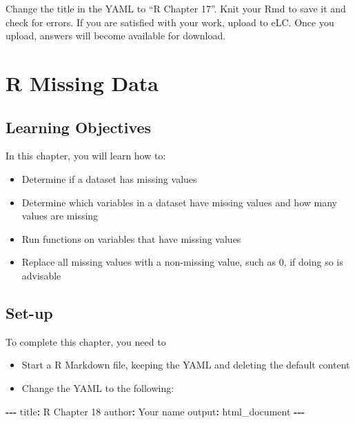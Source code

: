 \documentclass[
]{book}
\makeatletter
\newenvironment{Shaded}{\begin{snugshade}}{\end{snugshade}}
\newcommand{\NormalTok}[1]{#1}
\newcommand{\SpecialCharTok}[1]{\textcolor[rgb]{0.43,0.43,0.43}{\textbf{#1}}}
\newcommand{\StringTok}[1]{\textcolor[rgb]{0.5,0.5,0.5}{#1}}
\providecommand{\tightlist}{%
  \setlength{\itemsep}{0pt}\setlength{\parskip}{0pt}}
\newenvironment{kframe}{%
\medskip{}
\setlength{\fboxsep}{.8em}
 \def\at@end@of@kframe{}%
 \ifinner\ifhmode%
  \def\at@end@of@kframe{\end{minipage}}%
  \begin{minipage}{\columnwidth}%
 \fi\fi%
 \def\FrameCommand##1{\hskip\@totalleftmargin \hskip-\fboxsep
 \colorbox{shadecolor}{##1}\hskip-\fboxsep
     \hskip-\linewidth \hskip-\@totalleftmargin \hskip\columnwidth}%
 \MakeFramed {\advance\hsize-\width
   \@totalleftmargin\z@ \linewidth\hsize
   \@setminipage}}%
 {\par\unskip\endMakeFramed%
 \at@end@of@kframe}
\renewenvironment{Shaded}{\begin{kframe}}{\end{kframe}}
\makeatother
\begin{document}
Change the title in the YAML to ``R Chapter 17''. Knit your Rmd to save it and check for errors. If you are satisfied with your work, upload to eLC. Once you upload, answers will become available for download.

\hypertarget{r-missing-data}{%
\chapter{R Missing Data}\label{r-missing-data}}

\hypertarget{learning-objectives-1}{%
\section{Learning Objectives}\label{learning-objectives-1}}

In this chapter, you will learn how to:

\begin{itemize}
\tightlist
\item
  Determine if a dataset has missing values
\item
  Determine which variables in a dataset have missing values and how many values are missing
\item
  Run functions on variables that have missing values
\item
  Replace all missing values with a non-missing value, such as 0, if doing so is advisable
\end{itemize}

\hypertarget{set-up-1}{%
\section{Set-up}\label{set-up-1}}

To complete this chapter, you need to

\begin{itemize}
\item
  Start a R Markdown file, keeping the YAML and deleting the default content
\item
  Change the YAML to the following:
\end{itemize}

\begin{Shaded}
\begin{Highlighting}[]
\SpecialCharTok{{-}{-}{-}}
\NormalTok{title}\SpecialCharTok{:} \StringTok{\textquotesingle{}R Chapter 18\textquotesingle{}}
\NormalTok{author}\SpecialCharTok{:} \StringTok{\textquotesingle{}Your name\textquotesingle{}}
\NormalTok{output}\SpecialCharTok{:}\NormalTok{ html\_document}
\SpecialCharTok{{-}{-}{-}}
\end{Highlighting}
\end{Shaded}
\end{document}
